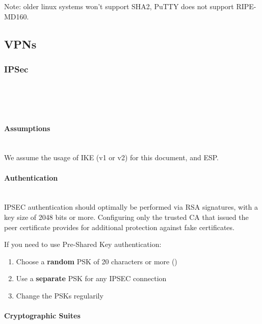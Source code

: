 Note: older linux systems won't support SHA2, PuTTY does not support RIPE-MD160.
\\


\subsection{VPNs}
\subsubsection{IPSec}

 \\
 \\
 \\

\paragraph*{Assumptions}\mbox{}\\

We assume the usage of IKE (v1 or v2) for this document, and ESP.

\paragraph*{Authentication}\mbox{}\\

IPSEC authentication should optimally be performed via RSA signatures,
with a key size of 2048 bits or more. Configuring only the trusted CA
that issued the peer certificate provides for additional protection
against fake certificates.

If you need to use Pre-Shared Key authentication:

\begin{enumerate}
\item Choose a \textbf{random} PSK of 20 characters or more ()
\item Use a \textbf{separate} PSK for any IPSEC connection
\item Change the PSKs regularily
\end{enumerate}

\paragraph*{Cryptographic Suites}\mbox{}\\

